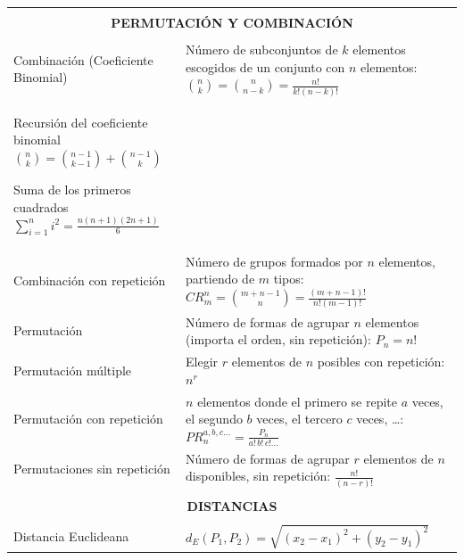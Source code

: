 \begin{center}
{\renewcommand{\arraystretch}{1.4}
\begin{tabular}{|p{}|p{}|}
\hline
\multicolumn{2}{|c|}{} \\
\multicolumn{2}{|c|}{\textbf{PERMUTACIÓN Y COMBINACIÓN}} \\
\multicolumn{2}{|c|}{} \\ \hline

Combinación (Coeficiente Binomial) &
Número de subconjuntos de $k$ elementos escogidos de un conjunto con $n$ elementos:
$\displaystyle \binom{n}{k} = \binom{n}{n-k} = \frac{n!}{k!(n-k)!}$ \\ \hline

Recursión del coeficiente binomial $\displaystyle \binom{n}{k} = \binom{n-1}{k-1} + \binom{n-1}{k}$

Suma de los primeros cuadrados
$\displaystyle \sum_{i=1}^{n} i^2 = \frac{n(n+1)(2n+1)}{6} $ \\ \hline

Combinación con repetición &
Número de grupos formados por $n$ elementos, partiendo de $m$ tipos:
$\displaystyle CR_{m}^{n} = \binom{m+n-1}{n} = \frac{(m+n-1)!}{n!(m-1)!}$ \\ \hline

Permutación &
Número de formas de agrupar $n$ elementos (importa el orden, sin repetición):
$P_{n} = n!$ \\ \hline

Permutación múltiple &
Elegir $r$ elementos de $n$ posibles con repetición:
$\displaystyle n^{r}$ \\ \hline

Permutación con repetición &
$n$ elementos donde el primero se repite $a$ veces, el segundo $b$ veces, el tercero $c$ veces, \ldots:
$\displaystyle PR_{n}^{a,b,c\ldots} = \frac{P_{n}}{a!\,b!\,c!\ldots}$ \\ \hline

Permutaciones sin repetición &
Número de formas de agrupar $r$ elementos de $n$ disponibles, sin repetición:
$\displaystyle \frac{n!}{(n-r)!}$ \\ \hline

\multicolumn{2}{|c|}{} \\
\multicolumn{2}{|c|}{\textbf{DISTANCIAS}} \\
\multicolumn{2}{|c|}{} \\ \hline

Distancia Euclideana &
$\displaystyle d_{E}(P_{1},P_{2}) = \sqrt{(x_{2}-x_{1})^{2}+(y_{2}-y_{1})^{2}}$ \\ \hline


\end{tabular}}
\end{center}
